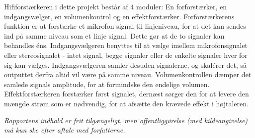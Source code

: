 \begin{multicols}{2}
{\begin{minipage}{2.8in}
Hififorstærkeren i dette projekt består af 4 moduler: En forforstærker, en indgangsvælger, en volumenkontrol og en effektforstærker. Forforstærkerens funktion er at forstærke et mikrofon signal til linjeniveau, for at det kan sendes ind på samme niveau som et linje signal. Dette gør at de to signaler kan behandles éns.
Indgangsvælgeren benyttes til at vælge imellem mikrofonsignalet eller stereosignalet - intet signal, begge signaler eller de enkelte signaler hver for sig kan vælges. Indgangsvælgeren samler desuden signalerne, og skalérer det, så outputtet derfra altid vil være på samme niveau.
Volumenkontrollen dæmper det samlede signals amplitude, for at formindske den endelige volumen.
Effektforstærkeren forstærker først signalet, dernæst sørger den for at levere den mængde strøm som er nødvendig, for at afsætte den krævede effekt i højtaleren.
\end{minipage}}
\newline
\end{multicols}
\textit{\scriptsize{Rapportens indhold er frit tilgængeligt, men offentliggørelse (med kildeangivelse) må kun ske efter aftale med forfatterne.}}